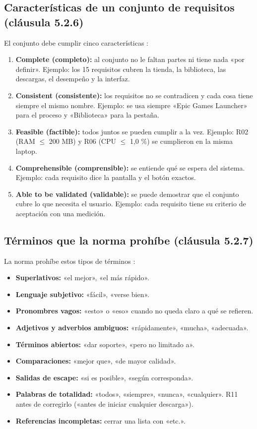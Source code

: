 \documentclass[10pt,a4paper]{article}
\begin{document}
\subsection{Caracter\'isticas de un conjunto de requisitos (cl\'ausula 5.2.6)}
El conjunto debe cumplir cinco caracter\'isticas \cite[cl.~5.2.6]{iso29148}:
\begin{enumerate}
\item \textbf{Complete (completo):} al conjunto no le faltan partes ni tiene nada «por definir». Ejemplo: los 15 requisitos cubren la tienda, la biblioteca, las descargas, el desempeño y la interfaz.
\item \textbf{Consistent (consistente):} los requisitos no se contradicen y cada cosa tiene siempre el mismo nombre. Ejemplo: se usa siempre «Epic Games Launcher» para el proceso y «Biblioteca» para la pestaña.
\item \textbf{Feasible (factible):} todos juntos se pueden cumplir a la vez. Ejemplo: R02 (RAM $\leq$ 200 MB) y R06 (CPU $\leq$ 1,0 \%) se cumplieron en la misma laptop.
\item \textbf{Comprehensible (comprensible):} se entiende qué se espera del sistema. Ejemplo: cada requisito dice la pantalla y el botón exactos.
\item \textbf{Able to be validated (validable):} se puede demostrar que el conjunto cubre lo que necesita el usuario. Ejemplo: cada requisito tiene su criterio de aceptación con una medición.
\end{enumerate}

\subsection{T\'erminos que la norma proh\'ibe (cl\'ausula 5.2.7)}
La norma proh\'ibe estos tipos de t\'erminos \cite[cl.~5.2.7]{iso29148}:
\begin{itemize}
\item \textbf{Superlativos:} «el mejor», «el más rápido».
\item \textbf{Lenguaje subjetivo:} «fácil», «verse bien».
\item \textbf{Pronombres vagos:} «esto» o «eso» cuando no queda claro a qué se refieren.
\item \textbf{Adjetivos y adverbios ambiguos:} «rápidamente», «mucha», «adecuada».
\item \textbf{Términos abiertos:} «dar soporte», «pero no limitado a».
\item \textbf{Comparaciones:} «mejor que», «de mayor calidad».
\item \textbf{Salidas de escape:} «si es posible», «según corresponda».
\item \textbf{Palabras de totalidad:} «todos», «siempre», «nunca», «cualquier». R11 antes de corregirlo («antes de iniciar cualquier descarga»).
\item \textbf{Referencias incompletas:} cerrar una lista con «etc.».
\end{itemize}
\end{document}
